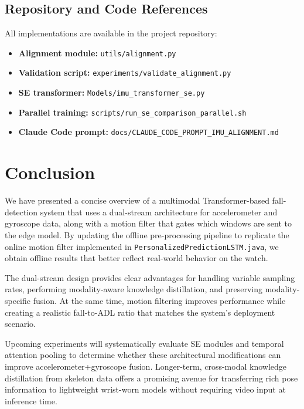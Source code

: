 \subsection{Repository and Code References}

All implementations are available in the project repository:
\begin{itemize}
    \item \textbf{Alignment module:} \texttt{utils/alignment.py}
    \item \textbf{Validation script:} \texttt{experiments/validate\_alignment.py}
    \item \textbf{SE transformer:} \texttt{Models/imu\_transformer\_se.py}
    \item \textbf{Parallel training:} \texttt{scripts/run\_se\_comparison\_parallel.sh}
    \item \textbf{Claude Code prompt:} \texttt{docs/CLAUDE\_CODE\_PROMPT\_IMU\_ALIGNMENT.md}
\end{itemize}
\section{Conclusion}

We have presented a concise overview of a multimodal Transformer-based fall-detection system that uses a dual-stream architecture for accelerometer and gyroscope data, along with a motion filter that gates which windows are sent to the edge model. By updating the offline pre-processing pipeline to replicate the online motion filter implemented in \texttt{PersonalizedPredictionLSTM.java}, we obtain offline results that better reflect real-world behavior on the watch.

The dual-stream design provides clear advantages for handling variable sampling rates, performing modality-aware knowledge distillation, and preserving modality-specific fusion. At the same time, motion filtering improves performance while creating a realistic fall-to-ADL ratio that matches the system's deployment scenario. 

Upcoming experiments will systematically evaluate SE modules and temporal attention pooling to determine whether these architectural modifications can improve accelerometer+gyroscope fusion. Longer-term, cross-modal knowledge distillation from skeleton data offers a promising avenue for transferring rich pose information to lightweight wrist-worn models without requiring video input at inference time.


